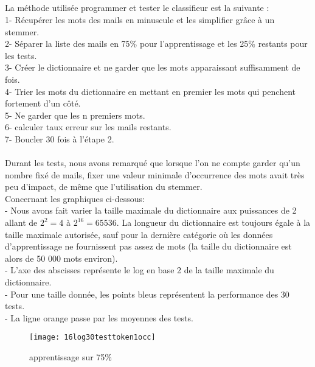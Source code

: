 \documentclass[a4paper]{article}
\begin{document}
\subsection{}
\begin{minipage}{\textwidth}
La méthode utilisée programmer et tester le classifieur est la suivante :\\
1- Récupérer les mots des mails en minuscule et les simplifier grâce à un stemmer.\\
2- Séparer la liste des mails en 75\% pour l'apprentissage et les 25\% restants pour les tests.\\
3- Créer le dictionnaire et ne garder que les mots apparaissant suffisamment de fois.\\
4- Trier les mots du dictionnaire en mettant en premier les mots qui penchent fortement d'un côté.\\
5- Ne garder que les n premiers mots.\\
6- calculer taux erreur sur les mails restants.\\
7- Boucler 30 fois à l'étape 2.\\
\\
Durant les tests, nous avons remarqué que lorsque l'on ne compte garder qu'un nombre fixé de mails, fixer une valeur minimale d’occurrence des mots avait très peu d'impact, de même que l'utilisation du stemmer.\\

Concernant les graphiques ci-dessous:\\
- Nous avons fait varier la taille maximale du dictionnaire aux puissances de 2 allant de $2^2=4$ à $2^{16}=65536$. La longueur du dictionnaire est toujours égale à la taille maximale autorisée, sauf pour la dernière catégorie où les données d'apprentissage ne fournissent pas assez de mots (la taille du dictionnaire est alors de 50 000 mots environ).\\
- L'axe des abscisses représente le log en base 2 de la taille maximale du dictionnaire.\\
- Pour une taille donnée, les points bleus représentent la performance des 30 tests.\\
- La ligne orange passe par les moyennes des tests.

\begin{figure}[H]
\texttt{[image: 16log30testtoken1occ]}
\caption{apprentissage sur 75\%}
\end{figure}
\end{minipage}
\end{document}
